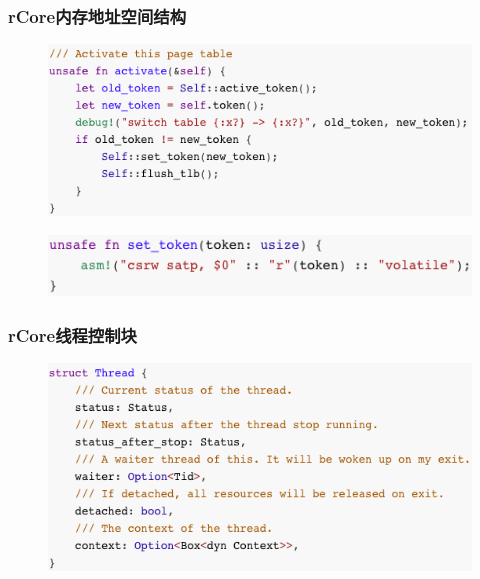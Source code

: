 \begin{frame}[fragile]
    \frametitle{rCore内存地址空间结构}
    \begin{figure}
    \includegraphics[width=0.7\linewidth]{figs/fn-activate.png}
    \end{figure}

% 

    \begin{figure}
    \includegraphics[width=0.6\linewidth]{figs/fn-set_token.png}
    \end{figure}

% 
\end{frame}
\begin{frame}[fragile]
    \frametitle{rCore线程控制块}
    \begin{figure}
    \includegraphics[width=0.8\linewidth]{figs/struct-Thread.png}
    \end{figure}

\end{frame}
